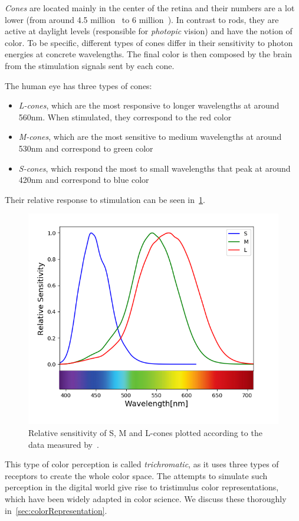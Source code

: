 \emph{Cones} are located mainly in the center of the retina and their numbers are a lot lower (from around 4.5 million~\cite{rods91cones4f5} to 6 million~\cite{rods125cones6}). In contrast to rods, they are active at daylight levels (responsible for \emph{photopic} vision) and have the notion of color. To be specific, different types of cones differ in their sensitivity to photon energies at concrete wavelengths. The final color is then composed by the brain from the stimulation signals sent by each cone.

The human eye has three types of cones:
\begin{itemize}
	\item \emph{L-cones}, which are the most responsive to longer wavelengths at around 560nm. When stimulated, they correspond to the red color
	\item \emph{M-cones}, which are the most sensitive to medium wavelengths at around 530nm and correspond to green color
	\item \emph{S-cones}, which respond the most to small wavelengths that peak at around 420nm and correspond to blue color
\end{itemize}

Their relative response to stimulation can be seen in~\cref{fig:coneSensitivity}.
\begin{figure}[t]
	\centering
	\includegraphics[width=0.5\linewidth]{img/cone_sensitivity.png}
	\caption{Relative sensitivity of S, M and L-cones plotted according to the data measured by~\citet{coneSensitivities}.} \label{fig:coneSensitivity}
\end{figure}

This type of color perception is called \emph{trichromatic}, as it uses three types of receptors to create the whole color space. The attempts to simulate such perception in the digital world give rise to tristimulus color representations, which have been widely adapted in color science. We discuss these thoroughly in~\cref{sec:colorRepresentation}.


